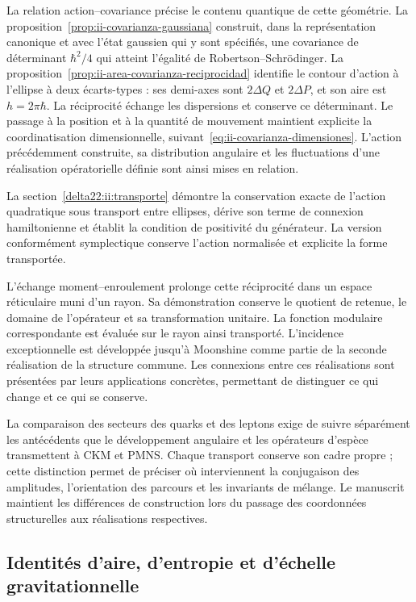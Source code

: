 La relation action--covariance précise le contenu quantique de cette géométrie. La proposition~\ref{prop:ii-covarianza-gaussiana} construit, dans la représentation canonique et avec l'état gaussien qui y sont spécifiés, une covariance de déterminant \(\hbar^2/4\) qui atteint l'égalité de Robertson--Schrödinger. La proposition~\ref{prop:ii-area-covarianza-reciprocidad} identifie le contour d'action à l'ellipse à deux écarts-types : ses demi-axes sont \(2\Delta Q\) et \(2\Delta P\), et son aire est \(h=2\pi\hbar\). La réciprocité échange les dispersions et conserve ce déterminant. Le passage à la position et à la quantité de mouvement maintient explicite la coordinatisation dimensionnelle, suivant~\eqref{eq:ii-covarianza-dimensiones}. L'action précédemment construite, sa distribution angulaire et les fluctuations d'une réalisation opératorielle définie sont ainsi mises en relation.

La section~\ref{delta22:ii:transporte} démontre la conservation exacte de l'action quadratique sous transport entre ellipses, dérive son terme de connexion hamiltonienne et établit la condition de positivité du générateur. La version conformément symplectique conserve l'action normalisée et explicite la forme transportée.


L'échange moment--enroulement prolonge cette réciprocité dans
un espace réticulaire muni d'un rayon. Sa démonstration conserve le quotient
de retenue, le domaine de l'opérateur et sa transformation unitaire.
La fonction modulaire correspondante est évaluée sur le rayon ainsi
transporté. L'incidence exceptionnelle est développée jusqu'à Moonshine
comme partie de la seconde réalisation de la structure commune. Les
connexions entre ces réalisations sont présentées par leurs applications
concrètes, permettant de distinguer ce qui change et ce qui se conserve.

La comparaison des secteurs des quarks et des leptons exige de suivre séparément les antécédents que le développement angulaire et les opérateurs d'espèce transmettent à CKM et PMNS. Chaque transport conserve son cadre propre ; cette distinction permet de préciser où interviennent la conjugaison des amplitudes, l'orientation des parcours et les invariants de mélange. Le manuscrit maintient les différences de construction lors du passage des coordonnées structurelles aux réalisations respectives.

\subsection{Identités d'aire, d'entropie et d'échelle gravitationnelle}

